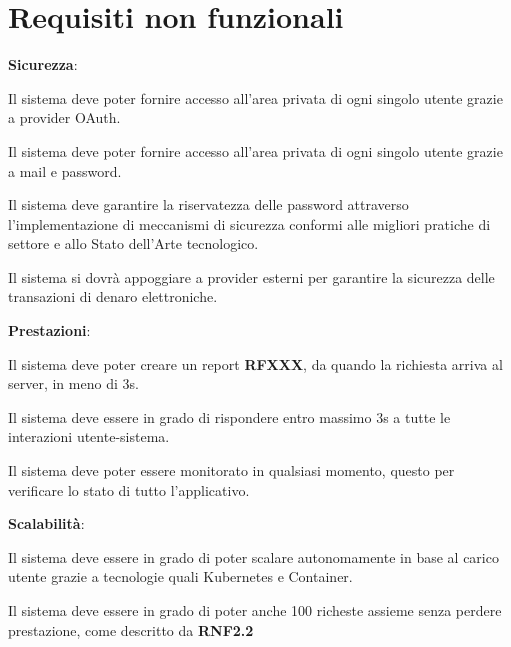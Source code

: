 \section{Requisiti non funzionali}

\begin{rnfenum}
    \item \textbf{Sicurezza}:
        
        \begin{rnfenum}
            \item Il sistema deve poter fornire accesso all'area privata di ogni singolo utente grazie a provider OAuth.
            \item Il sistema deve poter fornire accesso all'area privata di ogni singolo utente grazie a mail e password.
            \item Il sistema deve garantire la riservatezza delle password attraverso l'implementazione di meccanismi di sicurezza conformi alle migliori pratiche di settore e allo Stato dell'Arte tecnologico.
            \item Il sistema si dovrà appoggiare a provider esterni per garantire la sicurezza delle transazioni di denaro elettroniche.
        \end{rnfenum}
    
    \item \textbf{Prestazioni}: 

        \begin{rnfenum}
            \item Il sistema deve poter creare un report \textbf{RFXXX}, da quando la richiesta arriva al server, in meno di 3s.
            \item Il sistema deve essere in grado di rispondere entro massimo 3s a tutte le interazioni utente-sistema.
            \item Il sistema deve poter essere monitorato in qualsiasi momento, questo per verificare lo stato di tutto l'applicativo.
        \end{rnfenum}
    
    \item \textbf{Scalabilità}: 
        \begin{rnfenum}
            \item Il sistema deve essere in grado di poter scalare autonomamente in base al carico utente grazie a tecnologie quali Kubernetes e Container.
            \item Il sistema deve essere in grado di poter anche 100 richeste assieme senza perdere prestazione, come descritto da \textbf{RNF2.2}
        \end{rnfenum}


\end{rnfenum}

